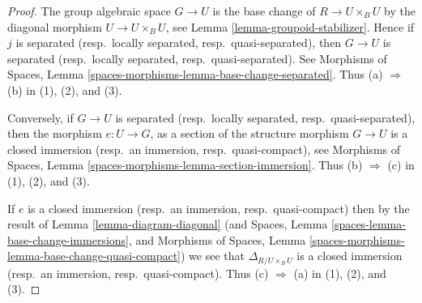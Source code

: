 \documentclass{stacks-project}
\theoremstyle{plain}
\theoremstyle{definition}
\theoremstyle{remark}
\numberwithin{equation}{subsection}
\begin{document}
\begin{proof}
The group algebraic space $G \to U$ is the base change of $R \to U \times_B U$
by the diagonal morphism $U \to U \times_B U$, see
Lemma \ref{lemma-groupoid-stabilizer}. Hence if
$j$ is separated (resp.\ locally separated, resp.\ quasi-separated),
then $G \to U$ is separated (resp.\ locally separated, resp.\ quasi-separated).
See
Morphisms of Spaces, Lemma
\ref{spaces-morphisms-lemma-base-change-separated}.
Thus (a) $\Rightarrow$ (b) in (1), (2), and (3).

\medskip\noindent
Conversely, if $G \to U$ is separated
(resp.\ locally separated, resp.\ quasi-separated), then the morphism
$e : U \to G$, as a section of the structure morphism $G \to U$ is a closed
immersion (resp.\ an immersion, resp.\ quasi-compact), see
Morphisms of Spaces, Lemma \ref{spaces-morphisms-lemma-section-immersion}.
Thus (b) $\Rightarrow$ (c) in (1), (2), and (3).

\medskip\noindent
If $e$ is a closed immersion (resp.\ an immersion, resp.\ quasi-compact)
then by the result of
Lemma \ref{lemma-diagram-diagonal}
(and
Spaces, Lemma \ref{spaces-lemma-base-change-immersions}, and
Morphisms of Spaces,
Lemma \ref{spaces-morphisms-lemma-base-change-quasi-compact})
we see that $\Delta_{R/U \times_B U}$ is a closed
immersion (resp.\ an immersion, resp.\ quasi-compact).
Thus (c) $\Rightarrow$ (a) in (1), (2), and (3).
\end{proof}



















\end{document}
